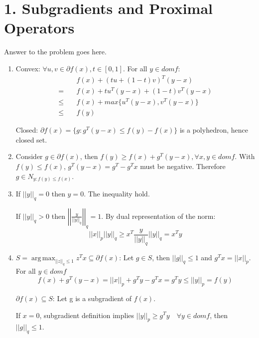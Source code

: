 \documentclass[12pt,letterpaper]{article}
\DeclareMathOperator*{\argmax}{arg\,max}
\begin{document}
\section*{1. Subgradients and Proximal Operators}

Answer to the problem goes here.

\begin{alphalist}

\item
\begin{enumerate}[label=(\roman*)]
    \item
        Convex: $\forall u, v \in \partial{}f(x), t \in [0, 1]$. For all $y \in
        dom f$:
        \[
            \begin{split}
                & f(x) + (tu + (1-t)v)^T(y-x) \\
                =\quad & f(x) + tu^T(y-x) + (1-t)v^T(y-x) \\
                \le\quad & f(x) + max\{u^T(y-x), v^T(y-x)\} \\
                \le\quad & f(y)
            \end{split}
        \]

        Closed: $\partial{}f(x) = \{ g : g^T(y - x) \le f(y) - f(x) \}$ is a
        polyhedron, hence closed set.

    \item
        Consider $g \in \partial{}f(x)$, then $f(y) \ge f(x) + g^T(y-x),
        \forall x, y \in dom f$. With $f(y) \le f(x)$, $g^T(y - x) = g^T -
        g^Tx$ must be negative.
        Therefore $g \in N_{y: f(y) \le f(x)}$.

    \item
        If $||y||_q = 0$ then $y = 0$. The inequality hold.

        If $||y||_q > 0$ then $\left|\left|\frac{y}{||y||_q}\right|\right|_q =
        1$. By dual representation of the norm:
        \[
            ||x||_p ||y||_q  \ge x^T\frac{y}{||y||_q} ||y||_q = x^Ty
        \]

    \item
        $S = \argmax_{||z||_q \le 1} z^Tx \subseteq \partial{}f(x)$: Let $g \in
        S$, then $||g||_q \le 1$ and $g^Tx = ||x||_p$. For all $y \in dom f$
        \[
            f(x) + g^T(y-x) = ||x||_p + g^Ty - g^Tx = g^Ty \le ||y||_p = f(y)
        \]

        $\partial{}f(x) \subseteq S$: Let g is a subgradient of $f(x)$.

        If $x = 0$, subgradient definition implies $||y||_p \ge g^Ty \quad \forall
        y\in dom f$, then $||g||_q \le 1$.


\end{enumerate}
\end{alphalist}
\end{document}
